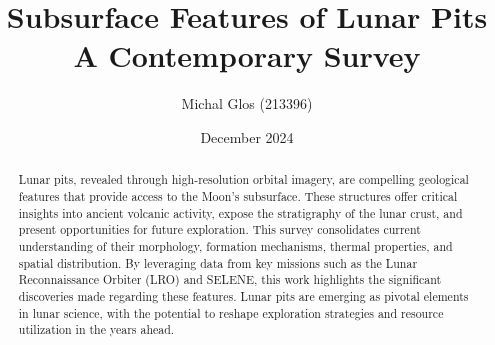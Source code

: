 \documentclass[12pt]{article}
\title{\textbf{Subsurface Features of Lunar Pits} \\ A Contemporary Survey}
\author{Michal Glos (213396)}
\date{December 2024}
\begin{document}
\maketitle

\begin{abstract}
Lunar pits, revealed through high-resolution orbital imagery, are compelling geological features that provide access to the Moon's subsurface. These structures offer critical insights into ancient volcanic activity, expose the stratigraphy of the lunar crust, and present opportunities for future exploration. This survey consolidates current understanding of their morphology, formation mechanisms, thermal properties, and spatial distribution. By leveraging data from key missions such as the Lunar Reconnaissance Orbiter (LRO) and SELENE, this work highlights the significant discoveries made regarding these features. Lunar pits are emerging as pivotal elements in lunar science, with the potential to reshape exploration strategies and resource utilization in the years ahead.
\end{abstract}


\newpage















\end{document}
